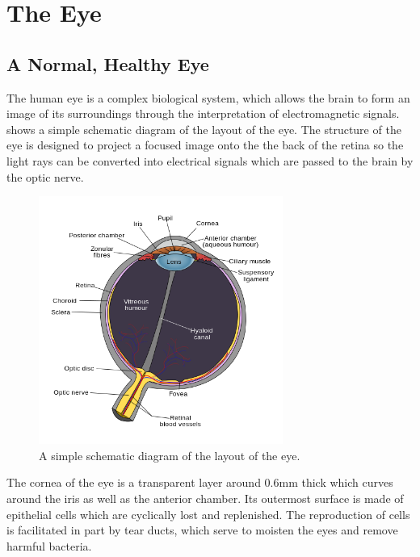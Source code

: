 
\chapter{The Eye}

\label{anatomy}

\section{A Normal, Healthy Eye}

The human eye is a complex biological system, which allows the brain to
form an image of its surroundings through the interpretation of
electromagnetic signals.  shows a simple schematic
diagram of the layout of the eye. The structure of the eye is designed to
project a focused image onto the the back of the retina so the light rays
can be converted into electrical signals which are passed to the brain by
the optic nerve.

\begin{figure}[H]
\centering
  \includegraphics[width=8cm]{figures/schematic_diagram_of_the_human_eye}
\caption{A simple schematic diagram of the layout of the eye.\cite{wikiRhcastilhos}}
\label{fig:eye_simple}
\end{figure}

The cornea of the eye is a transparent layer around 0.6mm thick
which curves around the iris as well as the anterior
chamber.\cite{yaylali1997corneal,thoft1983x,patel1994refractive}
Its outermost surface is made of epithelial cells which are cyclically lost
and replenished.\cite{jester1999cellular,hassell2010molecular} The
reproduction of cells is facilitated in part by tear ducts, which serve
to moisten the eyes and remove harmful bacteria.\cite{holly1977tear}

